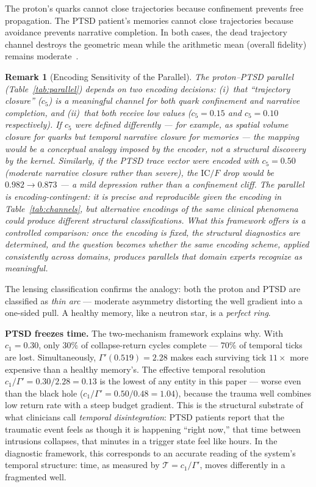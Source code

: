 \documentclass[
  aps,
  prd,
  twocolumn,
  superscriptaddress,
  nofootinbib,
  floatfix
]{revtex4-2}
\newtheorem{remark}{Remark}
\newcommand{\Gam}{\Gamma}
\newcommand{\IC}{\mathrm{IC}}
\begin{document}
The proton's quarks cannot close trajectories because
confinement prevents free propagation.  The PTSD patient's
memories cannot close trajectories because avoidance prevents
narrative completion.  In both cases, the dead trajectory
channel destroys the geometric mean while the arithmetic
mean (overall fidelity) remains
moderate~\cite{ehlers2000cognitive,vanderkolk2014body}.

\begin{remark}[Encoding Sensitivity of the Parallel]
\label{rem:parallel}
The proton--PTSD parallel (Table~\ref{tab:parallel})
depends on two encoding decisions: (i)~that ``trajectory
closure'' ($c_5$) is a meaningful channel for both quark
confinement and narrative completion, and (ii)~that both
receive low values ($c_5 = 0.15$ and $c_5 = 0.10$
respectively).  If $c_5$ were defined differently --- for
example, as spatial volume closure for quarks but temporal
narrative closure for memories --- the mapping would be a
\emph{conceptual analogy imposed by the encoder}, not a
structural discovery by the kernel.  Similarly, if the PTSD
trace vector were encoded with $c_5 = 0.50$ (moderate
narrative closure rather than severe), the $\IC/F$ drop
would be $0.982 \to 0.873$ --- a mild depression rather
than a confinement cliff.  The parallel is
\emph{encoding-contingent}: it is precise and reproducible
given the encoding in Table~\ref{tab:channels}, but
alternative encodings of the same clinical phenomena could
produce different structural classifications.  What this
framework offers is a \emph{controlled comparison}: once
the encoding is fixed, the structural diagnostics are
determined, and the question becomes whether the same
encoding scheme, applied consistently across domains,
produces parallels that domain experts recognize as
meaningful.
\end{remark}

The lensing classification confirms the analogy: both the
proton and PTSD are classified as \emph{thin arc} ---
moderate asymmetry distorting the well gradient into a
one-sided pull.  A healthy memory, like a neutron star, is
a \emph{perfect ring}.

\textbf{PTSD freezes time.}
The two-mechanism framework explains why.  With $c_1 = 0.30$,
only $30\%$ of collapse-return cycles complete --- $70\%$ of
temporal ticks are lost.  Simultaneously, $\Gam'(0.519) =
2.28$ makes each surviving tick $11\times$ more expensive than
a healthy memory's.  The effective temporal resolution
$c_1/\Gam' = 0.30/2.28 = 0.13$ is the lowest of any
entity in this paper --- worse even than the black hole
($c_1/\Gam' = 0.50/0.48 = 1.04$), because the trauma well
combines low return rate with a steep budget gradient.  This is the structural substrate of what
clinicians call \emph{temporal disintegration}: PTSD patients
report that the traumatic event feels as though it is
happening ``right now,'' that time between intrusions
collapses, that minutes in a trigger state feel like hours.
In the diagnostic framework, this corresponds to an
accurate reading of the system's temporal structure:
time, as measured by $\mathcal{T} = c_1/\Gam'$,
moves differently in a fragmented well.
\end{document}
